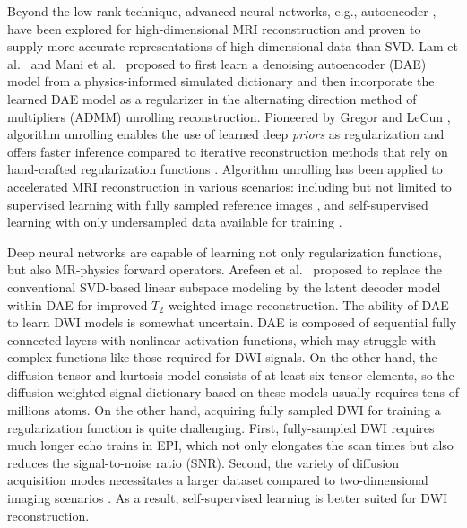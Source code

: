 \documentclass[AMA,STIX2COL,Linenumberson]{MRM}
\begin{document}
Beyond the low-rank technique,
advanced neural networks, e.g., autoencoder \cite{hinton_2006_ae},
have been explored for high-dimensional MRI reconstruction and
proven to supply more accurate representations of
high-dimensional data than SVD.
Lam et al.~\cite{lam_2019_mrsi} and Mani et al.~\cite{mani_2021_qmodel}
proposed to first learn a denoising autoencoder (DAE) model
from a physics-informed simulated dictionary
and then incorporate the learned DAE model as a regularizer
in the alternating direction method of multipliers (ADMM)
\cite{boyd_2010_admm}
unrolling reconstruction.
Pioneered by Gregor and LeCun \cite{gregor_2010_algunroll},
algorithm unrolling enables the use of learned deep \textit{priors}
as regularization and offers faster inference compared to
iterative reconstruction methods that rely on hand-crafted regularization functions
\cite{monga_2021_algunroll}.
Algorithm unrolling has been applied to
accelerated MRI reconstruction in various scenarios:
including but not limited to
supervised learning with fully sampled reference images
\cite{yang_2018_admmnet,hammernik_2018_varnet,aggarwal_2018_modl},
and self-supervised learning
with only undersampled data available for training
\cite{yaman_2020_ssdu,yaman_2022_zs}.

Deep neural networks are capable of learning
not only regularization functions,
but also MR-physics forward operators.
Arefeen et al.~\cite{arefeen_2023_latent} proposed
to replace the conventional SVD-based linear subspace modeling
\cite{huang_2012_t2basis}
by the latent decoder model within DAE
for improved $T_2$-weighted image reconstruction.
The ability of DAE to learn DWI models is somewhat uncertain.
DAE is composed of sequential fully connected layers
with nonlinear activation functions,
which may struggle with complex functions like those required for DWI signals.
On the other hand,
the diffusion tensor and kurtosis model \cite{basser_1994_dmri}
consists of at least six tensor elements,
so the diffusion-weighted signal dictionary
based on these models
usually requires tens of millions atoms.
On the other hand, acquiring fully sampled DWI
for training a regularization function is quite challenging.
First, fully-sampled DWI requires much longer echo trains in EPI,
which not only elongates the scan times
but also reduces the signal-to-noise ratio (SNR).
Second, the variety of diffusion acquisition modes necessitates
a larger dataset compared to two-dimensional imaging scenarios
\cite{knoll_2020_fastmri}.
As a result, self-supervised learning is better suited
for DWI reconstruction.
\end{document}
